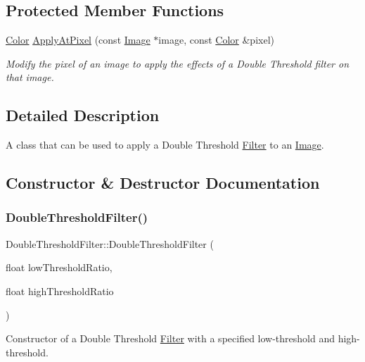 \subsection*{Protected Member Functions}
\begin{DoxyCompactItemize}
\item 
\hyperlink{classColor}{Color} \hyperlink{classDoubleThresholdFilter_a1ae6e4b94ecfa8c9e978b5da897c136d}{Apply\+At\+Pixel} (const \hyperlink{classImage}{Image} $\ast$image, const \hyperlink{classColor}{Color} \&pixel)
\begin{DoxyCompactList}\small\item\em Modify the pixel of an image to apply the effects of a Double Threshold filter on that image. \end{DoxyCompactList}\end{DoxyCompactItemize}


\subsection{Detailed Description}
A class that can be used to apply a Double Threshold \hyperlink{classFilter}{Filter} to an \hyperlink{classImage}{Image}. 

\subsection{Constructor \& Destructor Documentation}
\mbox{\label{classDoubleThresholdFilter_abd3b482cd8a1f554e819ced5fe36699f}} 
\subsubsection{\texorpdfstring{Double\+Threshold\+Filter()}{DoubleThresholdFilter()}}
{\footnotesize\ttfamily Double\+Threshold\+Filter\+::\+Double\+Threshold\+Filter (\begin{DoxyParamCaption}\item[{float}]{low\+Threshold\+Ratio,  }\item[{float}]{high\+Threshold\+Ratio }\end{DoxyParamCaption})}



Constructor of a Double Threshold \hyperlink{classFilter}{Filter} with a specified low-\/threshold and high-\/threshold. 


